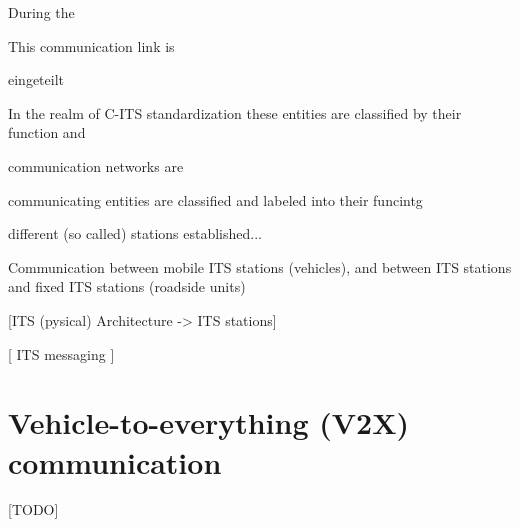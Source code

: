 During the 

This communication link is 

eingeteilt

In the realm of C-ITS standardization these entities are classified
by their function and 

communication networks are 

communicating entities are classified and labeled into their funcintg

 different (so called) stations established...



Communication between mobile ITS stations (vehicles), and between ITS stations and fixed ITS stations (roadside units)

[ITS (pysical) Architecture -> ITS stations]









[ ITS messaging ]



\newpage

\section{Vehicle-to-everything (V2X) communication}
\label{sec:v2x}
[TODO]
\newpage


